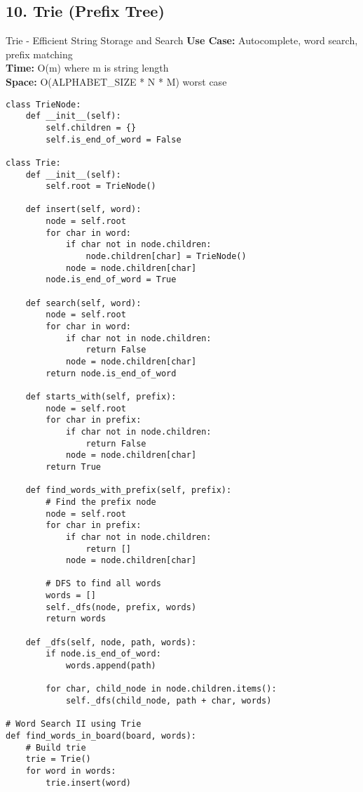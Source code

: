 \documentclass[10pt,a4paper]{article}
\begin{document}
\subsection{10. Trie (Prefix Tree)}

\begin{patternbox}{Trie - Efficient String Storage and Search}
\textbf{Use Case:} Autocomplete, word search, prefix matching\\
\textbf{Time:} O(m) where m is string length\\
\textbf{Space:} O(ALPHABET\_SIZE * N * M) worst case
\end{patternbox}

\begin{lstlisting}
class TrieNode:
    def __init__(self):
        self.children = {}
        self.is_end_of_word = False

class Trie:
    def __init__(self):
        self.root = TrieNode()

    def insert(self, word):
        node = self.root
        for char in word:
            if char not in node.children:
                node.children[char] = TrieNode()
            node = node.children[char]
        node.is_end_of_word = True

    def search(self, word):
        node = self.root
        for char in word:
            if char not in node.children:
                return False
            node = node.children[char]
        return node.is_end_of_word

    def starts_with(self, prefix):
        node = self.root
        for char in prefix:
            if char not in node.children:
                return False
            node = node.children[char]
        return True

    def find_words_with_prefix(self, prefix):
        # Find the prefix node
        node = self.root
        for char in prefix:
            if char not in node.children:
                return []
            node = node.children[char]

        # DFS to find all words
        words = []
        self._dfs(node, prefix, words)
        return words

    def _dfs(self, node, path, words):
        if node.is_end_of_word:
            words.append(path)

        for char, child_node in node.children.items():
            self._dfs(child_node, path + char, words)

# Word Search II using Trie
def find_words_in_board(board, words):
    # Build trie
    trie = Trie()
    for word in words:
        trie.insert(word)


\end{lstlisting}
\end{document}
